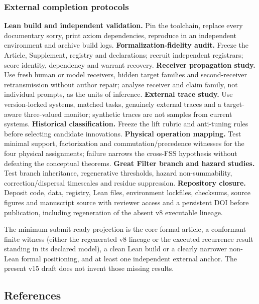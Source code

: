 \hypertarget{external-completion-protocols}{%
\subsubsection{External completion
protocols}\label{external-completion-protocols}}

\textbf{Lean build and independent validation.} Pin the toolchain,
replace every documentary sorry, print axiom dependencies, reproduce in
an independent environment and archive build logs.
\textbf{Formalization-fidelity audit.} Freeze the Article, Supplement,
registry and declarations; recruit independent registrars; score
identity, dependency and warrant recovery. \textbf{Receiver propagation
study.} Use fresh human or model receivers, hidden target families and
second-receiver retransmission without author repair; analyse receiver
and claim family, not individual prompts, as the units of inference.
\textbf{External trace study.} Use version-locked systems, matched
tasks, genuinely external traces and a target-aware three-valued
monitor; synthetic traces are not samples from current systems.
\textbf{Historical classification.} Freeze the lift rubric and
anti-tuning rules before selecting candidate innovations.
\textbf{Physical operation mapping.} Test minimal support, factorization
and commutation/precedence witnesses for the four physical assignments;
failure narrows the cross-FSS hypothesis without defeating the
conceptual theorems. \textbf{Great Filter branch and hazard studies.}
Test branch inheritance, regenerative thresholds, hazard
non-summability, correction/dispersal timescales and residue
suppression. \textbf{Repository closure.} Deposit code, data, registry,
Lean files, environment lockfiles, checksums, source figures and
manuscript source with reviewer access and a persistent DOI before
publication, including regeneration of the absent v8 executable lineage.

The minimum submit-ready projection is the core formal article, a
conformant finite witness (either the regenerated v8 lineage or the
executed recurrence result standing in its declared model), a clean Lean
build or a clearly narrower non-Lean formal positioning, and at least
one independent external anchor. The present v15 draft does not invent
those missing results.

\hypertarget{references}{%
\subsection{References}\label{references}}

